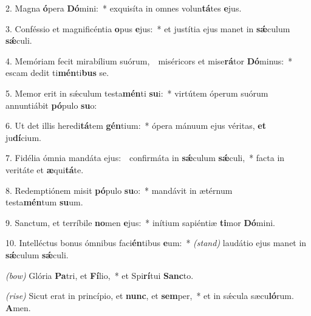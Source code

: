 2. Magna \textbf{ó}pera \textbf{Dó}mini:~* exquisíta in omnes volun\textbf{tá}tes \textbf{e}jus.

3. Conféssio et magnificéntia \textbf{o}pus \textbf{e}jus:~* et justítia ejus manet in \textbf{s\'{\ae}}culum \textbf{s\'{\ae}}culi.

4. Memóriam fecit mirabílium suórum,~{\color{red}\GreDagger}\ miséricors et mise\textbf{rá}tor \textbf{Dó}minus:~* escam dedit ti\textbf{mén}ti\textbf{bus} se.

5. Memor erit in s\'{\ae}culum testa\textbf{mén}ti \textbf{su}i:~* virtútem óperum suórum annuntiábit \textbf{pó}pulo \textbf{su}o:

6. Ut det illis heredi\textbf{tá}tem \textbf{gén}tium:~* ópera mánuum ejus véritas, \textbf{et}\\ ju\textbf{dí}cium.

7. Fidélia ómnia mandáta ejus:~{\color{red}\GreDagger}\ confirmáta in \textbf{s\'{\ae}}culum \textbf{s\'{\ae}}culi,~* facta in veritáte et \textbf{æ}qui\textbf{tá}te.

8. Redemptiónem misit \textbf{pó}pulo \textbf{su}o:~* mandávit in ætérnum\\ testa\textbf{mén}tum \textbf{su}um.

9. Sanctum, et terríbile \textbf{no}men \textbf{e}jus:~* inítium sapiéntiæ \textbf{ti}mor \textbf{Dó}mini.

10. Intelléctus bonus ómnibus faci\textbf{én}tibus \textbf{e}um:~* {\color{red}\textit{(stand)}} laudátio ejus manet in \textbf{s\'{\ae}}culum \textbf{s\'{\ae}}culi.

{\color{red}\textit{(bow)}} Glória \textbf{Pa}tri, et \textbf{Fí}lio,~* et Spi\textbf{rí}tui \textbf{Sanc}to.

{\color{red}\textit{(rise)}} Sicut erat in princípio, et \textbf{nunc}, et \textbf{sem}per,~* et in s\'{\ae}cula sæcu\textbf{ló}rum. \textbf{A}men.